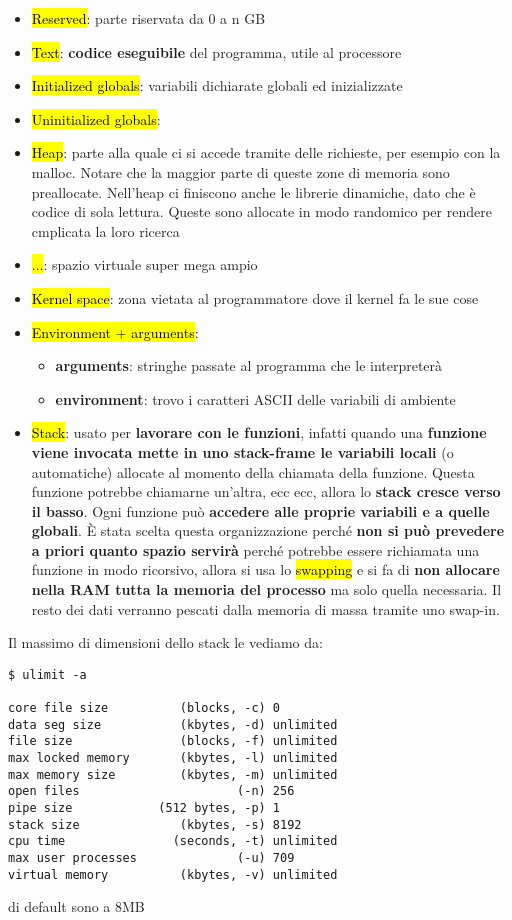 \begin{itemize}
	\item \hl{Reserved}: parte riservata da 0 a n GB
	\item \hl{Text}: \textbf{codice eseguibile} del programma, utile al processore
	\item \hl{Initialized globals}: variabili dichiarate globali ed inizializzate
	\item \hl{Uninitialized globals}: 
	\item \hl{Heap}: parte alla quale ci si accede tramite delle richieste, per esempio con la malloc. Notare che la maggior parte di queste zone di memoria sono preallocate. Nell'heap ci finiscono anche le librerie dinamiche, dato che è codice di sola lettura. Queste sono allocate in modo randomico per rendere cmplicata la loro ricerca
	\item \hl{...}: spazio virtuale super mega ampio
	\item \hl{Kernel space}: zona vietata al programmatore dove il kernel fa le sue cose
	\item \hl{Environment + arguments}:
		\begin{itemize}
			\item \textbf{arguments}: stringhe passate al programma che le interpreterà
			\item \textbf{environment}: trovo i caratteri ASCII delle variabili di ambiente
		\end{itemize}
	\item \hl{Stack}: usato per \textbf{lavorare con le funzioni}, infatti quando una \textbf{funzione viene invocata mette in uno stack-frame le variabili locali} (o automatiche) allocate al momento della chiamata della funzione. Questa funzione potrebbe chiamarne un'altra, ecc ecc, allora lo \textbf{stack cresce verso il basso}. Ogni funzione può \textbf{accedere alle proprie variabili e a quelle globali}. È stata scelta questa organizzazione perché \textbf{non si può prevedere a priori quanto spazio servirà} perché potrebbe essere richiamata una funzione in modo ricorsivo, allora si usa lo \hl{swapping} e si fa di \textbf{non allocare nella RAM tutta la memoria del processo} ma solo quella necessaria. Il resto dei dati verranno pescati dalla memoria di massa tramite uno swap-in. 
\end{itemize}

Il massimo di dimensioni dello stack le vediamo da:

\begin{lstlisting}
$ ulimit -a

core file size          (blocks, -c) 0
data seg size           (kbytes, -d) unlimited
file size               (blocks, -f) unlimited
max locked memory       (kbytes, -l) unlimited
max memory size         (kbytes, -m) unlimited
open files                      (-n) 256
pipe size            (512 bytes, -p) 1
stack size              (kbytes, -s) 8192
cpu time               (seconds, -t) unlimited
max user processes              (-u) 709
virtual memory          (kbytes, -v) unlimited
\end{lstlisting}

di default sono a 8MB






